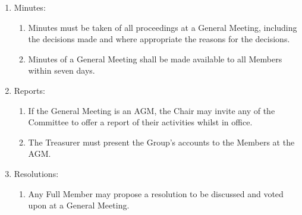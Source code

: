 \documentclass[12pt]{constitution}
\begin{document}
\begin{enumerate}
    \item Minutes:
    \begin{enumerate}
        \item Minutes must be taken of all proceedings at a General Meeting, including the decisions made and where appropriate the reasons for the decisions.
        \item Minutes of a General Meeting shall be made available to all Members within seven days.
    \end{enumerate}

    \item Reports:
    \begin{enumerate}
        \item If the General Meeting is an AGM, the Chair may invite any of the Committee to offer a report of their activities whilst in office.
        \item The Treasurer must present the Group's accounts to the Members at the AGM.
    \end{enumerate}

    \item Resolutions:
    \begin{enumerate}
        \item Any Full Member may propose a resolution to be discussed and voted upon at a General Meeting.
    \end{enumerate}
\end{enumerate}


\label{article:officers-committee}
\end{document}
